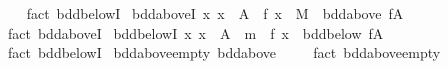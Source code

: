 \begin{isabellebody}
%
\isadelimproof
\ \ %
\endisadelimproof
%
\isatagproof
{}\isamarkupfalse%
\ {\isacharparenleft}{\kern0pt}fact\ bdd{\isacharunderscore}{\kern0pt}below{\isachardot}{\kern0pt}I{\isacharparenright}{\kern0pt}%
\endisatagproof
{\isafoldproof}%
%
\isadelimproof
\isanewline
%
\endisadelimproof
\isanewline
{}\isamarkupfalse%
\ bdd{\isacharunderscore}{\kern0pt}aboveI{}{\isacharcolon}{\kern0pt}\ {\isachardoublequoteopen}{\isacharparenleft}{\kern0pt}{\isasymAnd}x{\isachardot}{\kern0pt}\ x\ {\isasymin}\ A\ {\isasymLongrightarrow}\ f\ x\ {\isasymle}\ M{\isacharparenright}{\kern0pt}\ {\isasymLongrightarrow}\ bdd{\isacharunderscore}{\kern0pt}above\ {\isacharparenleft}{\kern0pt}f{\isacharbackquote}{\kern0pt}A{\isacharparenright}{\kern0pt}{\isachardoublequoteclose}\isanewline
%
\isadelimproof
\ \ %
\endisadelimproof
%
\isatagproof
{}\isamarkupfalse%
\ {\isacharparenleft}{\kern0pt}fact\ bdd{\isacharunderscore}{\kern0pt}above{\isachardot}{\kern0pt}I{}{\isacharparenright}{\kern0pt}%
\endisatagproof
{\isafoldproof}%
%
\isadelimproof
\isanewline
%
\endisadelimproof
\isanewline
{}\isamarkupfalse%
\ bdd{\isacharunderscore}{\kern0pt}belowI{}{\isacharcolon}{\kern0pt}\ {\isachardoublequoteopen}{\isacharparenleft}{\kern0pt}{\isasymAnd}x{\isachardot}{\kern0pt}\ x\ {\isasymin}\ A\ {\isasymLongrightarrow}\ m\ {\isasymle}\ f\ x{\isacharparenright}{\kern0pt}\ {\isasymLongrightarrow}\ bdd{\isacharunderscore}{\kern0pt}below\ {\isacharparenleft}{\kern0pt}f{\isacharbackquote}{\kern0pt}A{\isacharparenright}{\kern0pt}{\isachardoublequoteclose}\isanewline
%
\isadelimproof
\ \ %
\endisadelimproof
%
\isatagproof
{}\isamarkupfalse%
\ {\isacharparenleft}{\kern0pt}fact\ bdd{\isacharunderscore}{\kern0pt}below{\isachardot}{\kern0pt}I{}{\isacharparenright}{\kern0pt}%
\endisatagproof
{\isafoldproof}%
%
\isadelimproof
\isanewline
%
\endisadelimproof
\isanewline
{}\isamarkupfalse%
\ bdd{\isacharunderscore}{\kern0pt}above{\isacharunderscore}{\kern0pt}empty{\isacharcolon}{\kern0pt}\ {\isachardoublequoteopen}bdd{\isacharunderscore}{\kern0pt}above\ {\isacharbraceleft}{\kern0pt}{\isacharbraceright}{\kern0pt}{\isachardoublequoteclose}\isanewline
%
\isadelimproof
\ \ %
\endisadelimproof
%
\isatagproof
{}\isamarkupfalse%
\ {\isacharparenleft}{\kern0pt}fact\ bdd{\isacharunderscore}{\kern0pt}above{\isachardot}{\kern0pt}empty{\isacharparenright}{\kern0pt}%
\endisatagproof
{\isafoldproof}%
%
\isadelimproof
\isanewline
%
\endisadelimproof
\isanewline
{}\isamarkupfalse%

\end{isabellebody}
